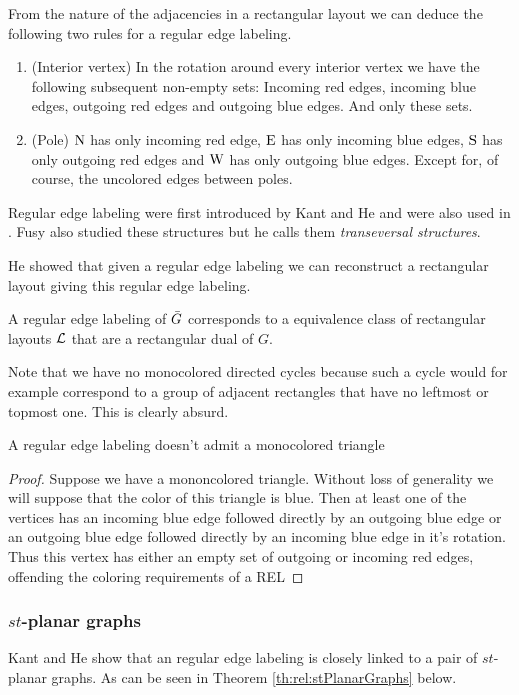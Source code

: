   From the nature of the adjacencies in a rectangular layout we can deduce the following two rules for a regular edge labeling.
  \begin{enumerate}
    \item (Interior vertex) In the rotation around every interior vertex we have the following subsequent non-empty sets: Incoming red edges, incoming blue edges, outgoing red edges and outgoing blue edges. And only these sets.
    \item (Pole) $\mathrm{N}$ has only incoming red edge, $\mathrm{E}$ has only incoming blue edges, $\mathrm{S}$ has only outgoing red edges and $\mathrm{W}$ has only outgoing blue edges. Except for, of course, the uncolored edges between poles.
  \end{enumerate}

  Regular edge labeling were first introduced by Kant and He \cite{Kant1997} and were also used in \cite{Eppstein2012}. Fusy also studied these structures \cite{Fusy2006,Fusy2009} but he calls them \emph{transeversal structures}.

  He showed \cite{He1993} that given a regular edge labeling we can reconstruct a rectangular layout giving this regular edge labeling.

  A regular edge labeling  of $\bar{G}$ corresponds to a equivalence class of rectangular layouts $\mathcal{L}$ that are a rectangular dual of $G$. 

  Note that we have no monocolored directed cycles because such a cycle would for example correspond to a  group of adjacent rectangles that have  no leftmost or topmost one. This is clearly absurd.

  \begin{lemma}
    \label{lm:rel:noMonoColoredTriangles}
    A regular edge labeling doesn't admit a monocolored triangle
  \end{lemma}

  \begin{proof}
    Suppose we have a mononcolored triangle. Without loss of generality we will suppose that the color of this triangle is blue. Then at least one of the vertices has an incoming blue edge followed directly by an outgoing blue edge or an outgoing blue edge followed directly by an incoming blue edge in it's rotation. Thus this vertex has either an empty set of outgoing or incoming red edges, offending the coloring requirements of a REL
  \end{proof}

  \subsubsection{$st$-planar graphs}
    Kant and He \cite[pp.179]{Kant1997} show that an regular edge labeling is closely linked to a pair of $st$-planar graphs. As can be seen in Theorem \ref{th:rel:stPlanarGraphs} below.

